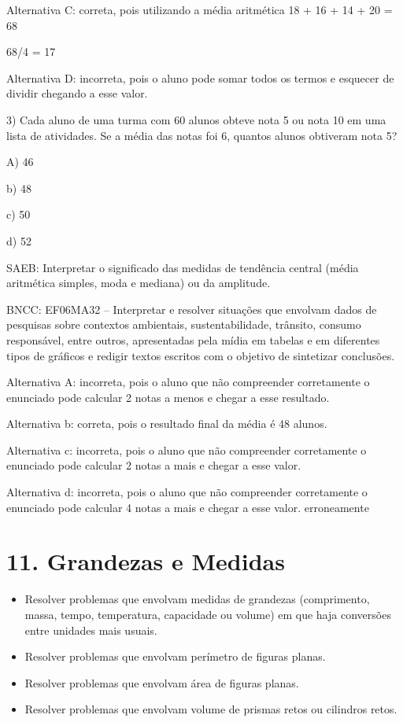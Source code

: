 Alternativa C: correta, pois utilizando a média aritmética 18 + 16 + 14
+ 20 = 68

68/4 = 17

Alternativa D: incorreta, pois o aluno pode somar todos os termos e
esquecer de dividir chegando a esse valor.

3) Cada aluno de uma turma com 60 alunos obteve nota 5 ou nota 10 em uma
lista de atividades. Se a média das notas foi 6, quantos alunos
obtiveram nota 5?

A) 46

b) 48

c) 50

d) 52

SAEB: Interpretar o significado das medidas de tendência central (média
aritmética simples, moda e mediana) ou da amplitude.

BNCC: EF06MA32 -- Interpretar e resolver situações que envolvam dados de
pesquisas sobre contextos ambientais, sustentabilidade, trânsito,
consumo responsável, entre outros, apresentadas pela mídia em tabelas e
em diferentes tipos de gráficos e redigir textos escritos com o objetivo
de sintetizar conclusões.

Alternativa A: incorreta, pois o aluno que não compreender corretamente
o enunciado pode calcular 2 notas a menos e chegar a esse resultado.

Alternativa b: correta, pois o resultado final da média é 48 alunos.

Alternativa c: incorreta, pois o aluno que não compreender corretamente
o enunciado pode calcular 2 notas a mais e chegar a esse valor.

Alternativa d: incorreta, pois o aluno que não compreender corretamente
o enunciado pode calcular 4 notas a mais e chegar a esse valor.
erroneamente

\chapter{11. Grandezas e Medidas}


\begin{itemize}
\item
  Resolver problemas que envolvam medidas de grandezas (comprimento,
  massa, tempo, temperatura, capacidade ou volume) em que haja
  conversões entre unidades mais usuais.
\item
  Resolver problemas que envolvam perímetro de figuras planas.
\item
  Resolver problemas que envolvam área de figuras planas.
\item
  Resolver problemas que envolvam volume de prismas retos ou cilindros
  retos.
\end{itemize}

